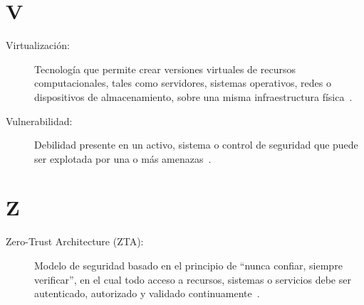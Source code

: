 \section*{V}
\begin{description}
	\item[Virtualización:] Tecnología que permite crear versiones virtuales de recursos computacionales, tales como servidores, sistemas operativos, redes o dispositivos de almacenamiento, sobre una misma infraestructura física~\cite{NISTVirtualization}.
	
	\item[Vulnerabilidad:] Debilidad presente en un activo, sistema o control de seguridad que puede ser explotada por una o más amenazas~\cite{ISO27000Glossary}.
\end{description}

\section*{Z}
\begin{description}
	\item[Zero-Trust Architecture (ZTA):] Modelo de seguridad basado en el principio de “nunca confiar, siempre verificar”, en el cual todo acceso a recursos, sistemas o servicios debe ser autenticado, autorizado y validado continuamente~\cite{NIST_ZTA}.
\end{description}
